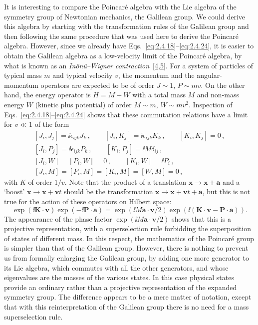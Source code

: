 It is interesting to compare the Poincar\'e algebra with the Lie algebra of the
symmetry group of Newtonian mechanics, the Galilean group. We could derive this
algebra by starting with the transformation rules of the Galilean group and
then following the same procedure that was used here to derive the Poincar\'e
algebra. However, since we already have Eqs.~\eqref{eq:2.4.18}--\eqref{eq:2.4.24}, it is easier
to obtain the Galilean algebra as a low-velocity limit of the Poincar\'e algebra,
by what is known as an \emph{In\"on\"u--Wigner contraction}~[\hyperref[ref:2.4]{4},\hyperref[ref:2.5]{5}].
For a system of particles of typical mass $m$ and typical velocity $v$, the
momentum and the angular-momentum operators are expected to be of order
$J\sim1$, $P\sim mv$. On the other hand, the energy operator is $H=M+W$ with a
total mass $M$ and non-mass energy $W$ (kinetic plus potential) of order
$M\sim m$, $W\sim mv^2$. Inspection of Eqs.~\eqref{eq:2.4.18}--\eqref{eq:2.4.24} shows that these
commutation relations have a limit for $v\ll1$ of the form
\[
\begin{gathered}
[J_i,J_j]=\ii\epsilon_{ijk}J_k\,,\qquad
[J_i,K_j]=\ii\epsilon_{ijk}K_k\,,\qquad
[K_i,K_j]=0\,,\\
[J_i,P_j]=\ii\epsilon_{ijk}P_k\,,\qquad
[K_i,P_j]=\ii M\delta_{ij}\,,\\
[J_i,W]=[P_i,W]=0\,,\qquad [K_i,W]=\ii P_i\,,\\
[J_i,M]=[P_i,M]=[K_i,M]=[W,M]=0\,,
\end{gathered}
\]
with $K$ of order $1/v$. Note that the product of a translation
$\mathbf{x}\to\mathbf{x}+\mathbf{a}$ and a `boost'
$\mathbf{x}\to\mathbf{x}+\mathbf{v}t$ should be the transformation
$\mathbf{x}\to\mathbf{x}+\mathbf{v}t+\mathbf{a}$, but this is not true for the
action of these operators on Hilbert space:
\[
\exp(\ii\mathbf{K}\cdot\mathbf{v})\exp(-\ii\mathbf{P}\cdot\mathbf{a})
=\exp(\ii M\mathbf{a}\cdot\mathbf{v}/2)
 \exp\!\left(\ii(\mathbf{K}\cdot\mathbf{v}-\mathbf{P}\cdot\mathbf{a})\right).
\]
The appearance of the phase factor $\exp(\ii M\mathbf{a}\cdot\mathbf{v}/2)$ shows
that this is a projective representation, with a superselection rule forbidding
the superposition of states of different mass. In this respect, the mathematics
of the Poincar\'e group is simpler than that of the Galilean group. However,
there is nothing to prevent us from formally enlarging the Galilean group, by
adding one more generator to its Lie algebra, which commutes with all the other
generators, and whose eigenvalues are the masses of the various states. In this
case physical states provide an ordinary rather than a projective
representation of the expanded symmetry group. The difference appears to be a
mere matter of notation, except that with this reinterpretation of the Galilean
group there is no need for a mass superselection rule.

